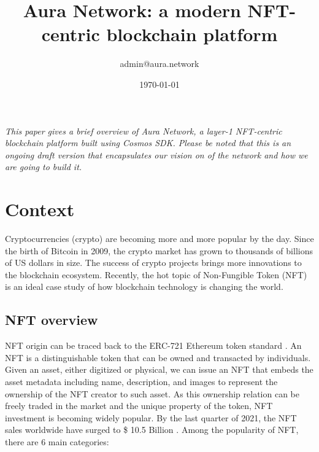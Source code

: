 \documentclass[12pt, titlepage]{article}
\begin{document}
\title{Aura Network: a modern NFT-centric blockchain platform}
\author{admin@aura.network}
\date{\today}
\maketitle

\tableofcontents
\newpage

\textit{
This paper gives a brief overview of \emph{Aura Network}, a layer-1 NFT-centric blockchain platform built using Cosmos SDK. Please be noted that this is an ongoing draft version that encapsulates our vision on of the network and how we are going to build it.}

\section{Context}

Cryptocurrencies (crypto) are becoming more and more popular by the day. Since the birth of Bitcoin in 2009, the crypto market has grown to thousands of billions of US dollars in size. The success of crypto projects brings more innovations to the blockchain ecosystem. Recently, the hot topic of Non-Fungible Token (NFT) is an ideal case study of how blockchain technology is changing the world.

\subsection{NFT overview}
NFT origin can be traced back to the ERC-721 Ethereum token standard \cite{entriken2018erc}. An NFT is a distinguishable token that can be owned and transacted by individuals. 
Given an asset, either digitized or physical, we can issue an NFT that embeds the asset metadata including name, description, and images to represent the ownership of the NFT creator to such asset. As this ownership relation can be freely traded in the market and the unique property of the token, NFT investment is becoming widely popular. By the last quarter of 2021, the NFT sales worldwide have surged to \$ 10.5 Billion \cite{nftsale}. Among the popularity of NFT, there are 6 main categories:
\end{document}
